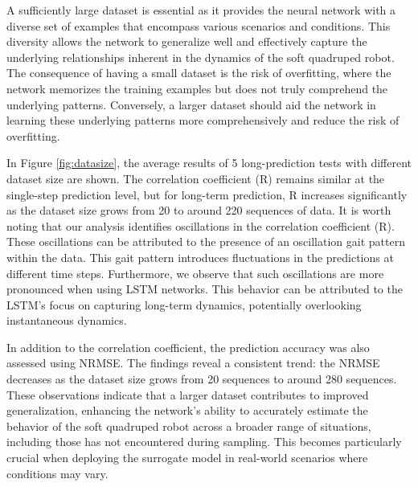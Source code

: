 A sufficiently large dataset is essential as it provides the neural network with a diverse set of examples that encompass various scenarios and conditions. This diversity allows the network to generalize well and effectively capture the underlying relationships inherent in the dynamics of the soft quadruped robot. The consequence of having a small dataset is the risk of overfitting, where the network memorizes the training examples but does not truly comprehend the underlying patterns. Conversely, a larger dataset should aid the network in learning these underlying patterns more comprehensively and reduce the risk of overfitting. 

In Figure \ref{fig:datasize}, the average results of 5 long-prediction tests with different dataset size are shown. The correlation coefficient (R) remains similar at the single-step prediction level, but for long-term prediction, R increases significantly as the dataset size grows from 20 to around 220 sequences of data. It is worth noting that our analysis identifies oscillations in the correlation coefficient (R). These oscillations can be attributed to the presence of an oscillation gait pattern within the data. This gait pattern introduces fluctuations in the predictions at different time steps. Furthermore, we observe that such oscillations are more pronounced when using LSTM networks. This behavior can be attributed to the LSTM's focus on capturing long-term dynamics, potentially overlooking instantaneous dynamics.

In addition to the correlation coefficient, the prediction accuracy was also assessed using \ac{NRMSE}. The findings reveal a consistent trend: the NRMSE decreases as the dataset size grows from 20 sequences to around 280 sequences. These observations indicate that a larger dataset contributes to improved generalization, enhancing the network's ability to accurately estimate the behavior of the soft quadruped robot across a broader range of situations, including those has not encountered during sampling. This becomes particularly crucial when deploying the surrogate model in real-world scenarios where conditions may vary.

